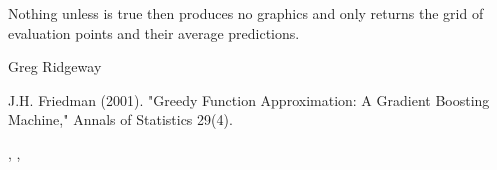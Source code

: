 \begin{Value}
Nothing unless  is true then  produces no
graphics and only returns the grid of evaluation points and their average
predictions.
\end{Value}
\begin{Author}\relax
Greg Ridgeway 
\end{Author}
\begin{References}\relax
J.H. Friedman (2001). "Greedy Function Approximation: A Gradient Boosting
Machine," Annals of Statistics 29(4).
\end{References}
\begin{SeeAlso}\relax
{}, , 
\end{SeeAlso}

